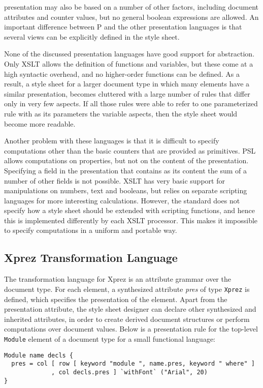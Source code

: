         presentation may also be based on a number of other factors, including document
        attributes and counter values, but no general boolean expressions are allowed.
        An important difference between P and the other presentation languages is that
        several views can be explicitly defined in the style sheet. 
\par {} None of the discussed presentation
        languages have good support for abstraction. Only XSLT allows the definition of
        functions and variables, but these come at a high syntactic overhead, and no
        higher-order functions can be defined. As a result, a style sheet for a larger
        document type in which many elements have a similar presentation, becomes
        cluttered with a large number of rules that differ only in very few aspects. If
        all those rules were able to refer to one parameterized rule with as its
        parameters the variable aspects, then the style sheet would become more
        readable.
\par Another problem with these languages is that it is difficult to
        specify computations other than the basic counters that are provided as
        primitives. PSL allows computations on properties, but not on the content of
        the presentation. Specifying a field in the presentation that contains as its
        content the sum of a number of other fields is not possible. XSLT has very
        basic support for manipulations on numbers, text and booleans, but relies on
        separate scripting languages for more interesting calculations. However, the
        standard does not specify how a style sheet should be extended with scripting
        functions, and hence this is implemented differently by each XSLT processor.
        This makes it impossible to specify computations in a uniform and portable
        way.
\subsection{{\sc Xprez} Transformation Language}

\par The transformation language for {\sc Xprez} is an attribute grammar
        over the document type. For each element, a synthesized attribute {\em pres}
        of type \texttt{Xprez} is defined, which specifies the presentation of the
        element. Apart from the presentation attribute, the style sheet designer can
        declare other synthesized and inherited attributes, in order to create derived
        document structures or perform computations over document values. Below is a
        presentation rule for the top-level \texttt{Module} element of a document type
        for a small functional language:\begin{small}\begin{verbatim}Module name decls {
  pres = col [ row [ keyword "module ", name.pres, keyword " where" ]   
             , col decls.pres ] `withFont` ("Arial", 20)
}\end{verbatim}\end{small}

